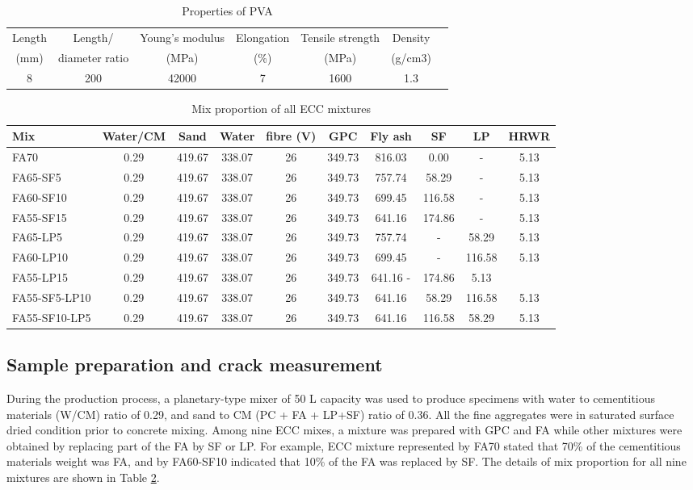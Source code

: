 \documentclass[11pt]{article}
\begin{document}
	\begin{table}[!h]
		\centering
		\caption{Properties of PVA}
		\begin{tabular}{ccccccc}
			\toprule
			Length &Length/&	Young’s modulus &	Elongation &Tensile strength &	Density \\
			(mm)	& diameter ratio & (MPa) & (\%)	 & (MPa) & (g/cm3) \\
			\midrule
			8&	200	&42000&	7&	1600&	1.3
			\\
			\bottomrule
		\end{tabular}
		\label{pva}
	\end{table}
	

	
	
	
	\begin{table}[!tp]
		\centering
		\caption{Mix proportion of all ECC mixtures}
		\begin{tabular}{lccccccccc}
			\toprule
			Mix&	Water/CM	&Sand&	Water&	fibre (V)&	GPC	&Fly ash&	SF&	LP&	HRWR
			\\
			\midrule
			FA70&	0.29&	419.67&	338.07	&26	&349.73&	816.03	&0.00&	-	&5.13
			\\
			FA65-SF5&	0.29&	419.67&	338.07&	26	&349.73	&757.74&	58.29&	-&	5.13
			\\
			FA60-SF10	&0.29&	419.67&	338.07&26&	349.73&	699.45&	116.58	&-&	5.13
			\\
			FA55-SF15&	0.29&	419.67&	338.07&	26&	349.73&	641.16&	174.86	&-&	5.13
			\\
			FA65-LP5&	0.29&	419.67	&338.07&	26	&349.73	&757.74	&-	&58.29&	5.13
			\\
			FA60-LP10&	0.29&	419.67&	338.07&	26&	349.73	&699.45	&-	&116.58	&5.13
			\\
			FA55-LP15&	0.29&	419.67&	338.07&	26&	349.73	&641.16	-&	174.86	&5.13
			\\
			FA55-SF5-LP10&	0.29&	419.67&	338.07	&26&	349.73&	641.16	&58.29	&116.58	&5.13
			\\
			FA55-SF10-LP5	&0.29	&419.67	&338.07	&26	&349.73	&641.16	&116.58	&58.29	&5.13
			\\
			\bottomrule
		\end{tabular}
		\label{mx}
	\end{table}
	

\subsection{Sample preparation and crack measurement}
	\label{experi}
	During the production process, a planetary-type mixer of 50 L capacity was used to produce specimens with water to cementitious materials (W/CM) ratio of 0.29, and sand to CM (PC + FA + LP+SF) ratio of 0.36. All the fine aggregates were in saturated surface dried condition prior to concrete mixing. Among nine ECC mixes, a mixture was prepared with GPC and FA while other mixtures were obtained by replacing part of the FA by SF or LP. For example, ECC mixture represented by FA70 stated that 70\% of the cementitious materials weight was FA, and by FA60-SF10 indicated that 10\% of the FA was replaced by SF. The details of mix proportion for all nine mixtures are shown in Table \ref{mx}. 
	
\end{document}
